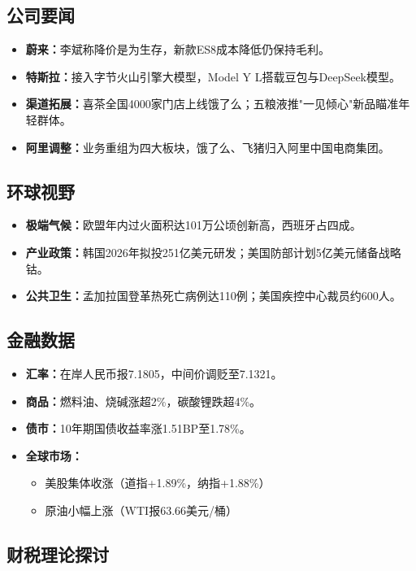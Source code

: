 \subsection{公司要闻}
\begin{itemize}
    \item \textbf{蔚来：}李斌称降价是为生存，新款ES8成本降低仍保持毛利。
    \item \textbf{特斯拉：}接入字节火山引擎大模型，Model Y L搭载豆包与DeepSeek模型。
    \item \textbf{渠道拓展：}喜茶全国4000家门店上线饿了么；五粮液推"一见倾心"新品瞄准年轻群体。
    \item \textbf{阿里调整：}业务重组为四大板块，饿了么、飞猪归入阿里中国电商集团。
\end{itemize}

\subsection{环球视野}
\begin{itemize}
    \item \textbf{极端气候：}欧盟年内过火面积达101万公顷创新高，西班牙占四成。
    \item \textbf{产业政策：}韩国2026年拟投251亿美元研发；美国防部计划5亿美元储备战略钴。
    \item \textbf{公共卫生：}孟加拉国登革热死亡病例达110例；美国疾控中心裁员约600人。
\end{itemize}

\subsection{金融数据}
\begin{itemize}
    \item \textbf{汇率：}在岸人民币报7.1805，中间价调贬至7.1321。
    \item \textbf{商品：}燃料油、烧碱涨超2\%，碳酸锂跌超4\%。
    \item \textbf{债市：}10年期国债收益率涨1.51BP至1.78\%。
    \item \textbf{全球市场：}
    \begin{itemize}
        \item 美股集体收涨（道指+1.89\%，纳指+1.88\%）
        \item 原油小幅上涨（WTI报63.66美元/桶）
    \end{itemize}
\end{itemize}

\subsection{财税理论探讨}
